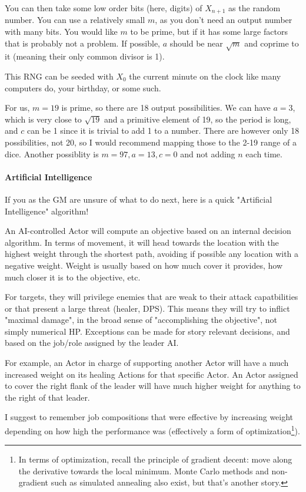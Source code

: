 You can then take some low order bits (here, digits) of $X_{n+1}$ as the random number. You can use a relatively small $m$, as you don't need an output number with many bits. You would like $m$ to be prime, but if it has some large factors that is probably not a problem. If possible, $a$ should be near $\sqrt{m}$ and coprime to it (meaning their only common divisor is 1). 

This RNG can be seeded with $X_0$ the current minute on the clock like many computers do, your birthday, or some such. 

For us, $m=19$ is prime, so there are 18 output possibilities. We can have $a=3$, which is very close to $\sqrt{19}$ and a primitive element of 19, so the period is long, and $c$ can be 1 since it is trivial to add 1 to a number. There are however only 18 possibilities, not 20, so I would recommend mapping those to the 2-19 range of a dice. Another possiblity is $m=97, a=13, c=0$ and not adding $n$ each time.



\paragraph{Artificial Intelligence}

If you as the GM are unsure of what to do next, here is a quick "Artificial Intelligence" algorithm!

An AI-controlled Actor will compute an objective based on an internal decision algorithm. In terms of movement, it will head towards the location with the highest weight through the shortest path, avoiding if possible any location with a negative weight. Weight is usually based on how much cover it provides, how much closer it is to the objective, etc.

For targets, they will privilege enemies that are weak to their attack capatbilities or that present a large threat (healer, DPS). This means they will try to inflict "maximal damage", in the broad sense of "accomplishing the objective", not simply numerical HP. Exceptions can be made for story relevant decisions, and based on the job/role assigned by the leader AI. 

For example, an Actor in charge of supporting another Actor will have a much increased weight on its healing Actions for that specific Actor. An Actor assigned to cover the right flank of the leader will have much higher weight for anything to the right of that leader.

I suggest to remember job compositions that were effective by increasing weight depending on how high the performance was (effectively a form of optimization\footnote{In terms of optimization, recall the principle of gradient decent: move along the derivative towards the local minimum. Monte Carlo methods and non-gradient such as simulated annealing also exist, but that's another story.}).